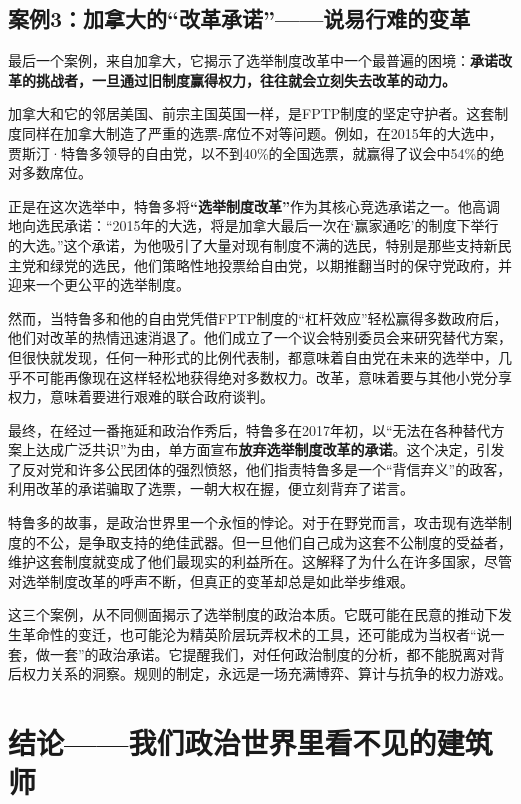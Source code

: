 \subsection{案例3：加拿大的“改革承诺”——说易行难的变革}

最后一个案例，来自加拿大，它揭示了选举制度改革中一个最普遍的困境：\textbf{承诺改革的挑战者，一旦通过旧制度赢得权力，往往就会立刻失去改革的动力。}

加拿大和它的邻居美国、前宗主国英国一样，是FPTP制度的坚定守护者。这套制度同样在加拿大制造了严重的选票-席位不对等问题。例如，在2015年的大选中，贾斯汀·特鲁多领导的自由党，以不到40\%的全国选票，就赢得了议会中54\%的绝对多数席位。

正是在这次选举中，特鲁多将\textbf{“选举制度改革”}作为其核心竞选承诺之一。他高调地向选民承诺：“2015年的大选，将是加拿大最后一次在‘赢家通吃’的制度下举行的大选。”这个承诺，为他吸引了大量对现有制度不满的选民，特别是那些支持新民主党和绿党的选民，他们策略性地投票给自由党，以期推翻当时的保守党政府，并迎来一个更公平的选举制度。

然而，当特鲁多和他的自由党凭借FPTP制度的“杠杆效应”轻松赢得多数政府后，他们对改革的热情迅速消退了。他们成立了一个议会特别委员会来研究替代方案，但很快就发现，任何一种形式的比例代表制，都意味着自由党在未来的选举中，几乎不可能再像现在这样轻松地获得绝对多数权力。改革，意味着要与其他小党分享权力，意味着要进行艰难的联合政府谈判。

最终，在经过一番拖延和政治作秀后，特鲁多在2017年初，以“无法在各种替代方案上达成广泛共识”为由，单方面宣布\textbf{放弃选举制度改革的承诺}。这个决定，引发了反对党和许多公民团体的强烈愤怒，他们指责特鲁多是一个“背信弃义”的政客，利用改革的承诺骗取了选票，一朝大权在握，便立刻背弃了诺言。

特鲁多的故事，是政治世界里一个永恒的悖论。对于在野党而言，攻击现有选举制度的不公，是争取支持的绝佳武器。但一旦他们自己成为这套不公制度的受益者，维护这套制度就变成了他们最现实的利益所在。这解释了为什么在许多国家，尽管对选举制度改革的呼声不断，但真正的变革却总是如此举步维艰。

这三个案例，从不同侧面揭示了选举制度的政治本质。它既可能在民意的推动下发生革命性的变迁，也可能沦为精英阶层玩弄权术的工具，还可能成为当权者“说一套，做一套”的政治承诺。它提醒我们，对任何政治制度的分析，都不能脱离对背后权力关系的洞察。规则的制定，永远是一场充满博弈、算计与抗争的权力游戏。

\section{结论——我们政治世界里看不见的建筑师}

